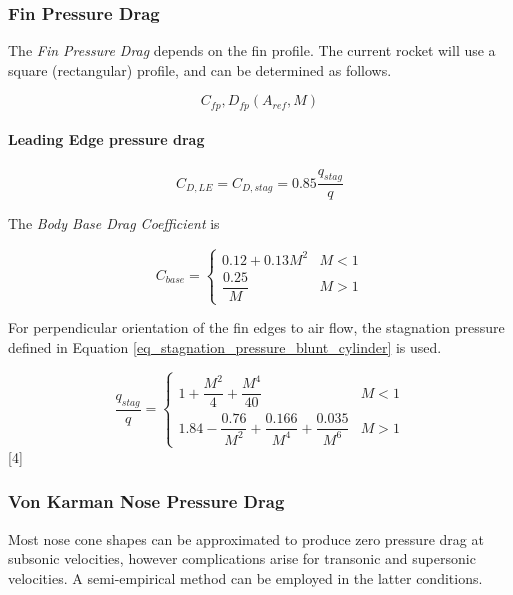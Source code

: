 \documentclass[]{book}
\let\oldparagraph\paragraph
\renewcommand{\paragraph}[1]{\oldparagraph{#1}\mbox{}}
\begin{document}
\subsubsection{Fin Pressure Drag}\label{fin-pressure-drag}

The \emph{Fin Pressure Drag} depends on the fin profile. The current
rocket will use a square (rectangular) profile, and can be determined as
follows.

\begin{equation}
C_{fp}, D_{fp} (A_{ref}, M) 
\end{equation}

\paragraph{Leading Edge pressure drag}\label{leading-edge-pressure-drag}

\begin{equation}
    C_{D,LE} = C_{D,stag} = 0.85 \dfrac{q_{stag}}{q}
\end{equation}

The \emph{Body Base Drag Coefficient} is

\begin{equation}
C_{base} =
\begin{cases}
    0.12 + 0.13 M^2     &   M < 1 \\
    \dfrac{0.25}{M}     &   M > 1
\end{cases}
\end{equation}

For perpendicular orientation of the fin edges to air flow, the
stagnation pressure defined in Equation
\ref{eq_stagnation_pressure_blunt_cylinder} is used.

\[
\dfrac{q_{stag}}{q} =  
\begin{cases}
    1 + \dfrac{M^2}{4} + \dfrac{M^4}{40}                                    & M < 1 \\
    1.84 - \dfrac{0.76}{M^2} + \dfrac{0.166}{M^4} + \dfrac{0.035}{M^6}      & M > 1
\end{cases}
\] {[}4{]}

\subsubsection{Von Karman Nose Pressure
Drag}\label{von-karman-nose-pressure-drag}

Most nose cone shapes can be approximated to produce zero pressure drag
at subsonic velocities, however complications arise for transonic and
supersonic velocities. A semi-empirical method can be employed in the
latter conditions.
\end{document}
